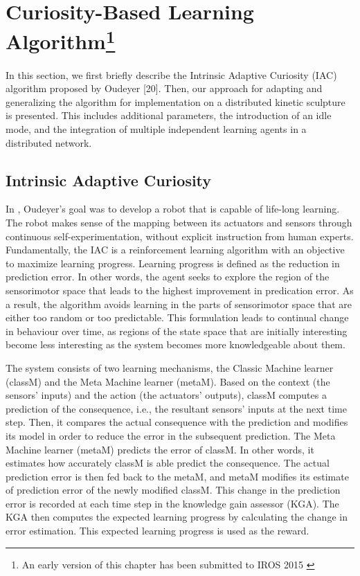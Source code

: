 \chapter[Curiosity-Based Learning Algorithm]
{Curiosity-Based Learning Algorithm\footnote{An early version of this chapter has been submitted to IROS 2015 \cite{Chan2015} }} 
\label{chap:cbla}
 
In this section, we first briefly describe the Intrinsic Adaptive Curiosity (IAC) algorithm proposed by Oudeyer [20]. Then, our approach for adapting and generalizing the algorithm for implementation on a distributed kinetic sculpture is presented. This includes additional parameters, the introduction of an idle mode, and the integration of multiple independent learning agents in a distributed network. 

\section{Intrinsic Adaptive Curiosity}

In \cite{Oudeyer2007}, Oudeyer's goal was to develop a robot that is capable of life-long learning. The robot makes sense of the mapping between its actuators and sensors through continuous self-experimentation, without explicit instruction from human experts. Fundamentally, the IAC is a reinforcement learning algorithm with an objective to maximize learning progress. Learning progress is defined as the reduction in prediction error. In other words, the agent seeks to explore the region of the sensorimotor space that leads to the highest improvement in predication error. As a result, the algorithm avoids learning in the parts of sensorimotor space that are either too random or too predictable. This formulation leads to continual change in behaviour over time, as regions of the state space that are initially interesting become less interesting as the system becomes more knowledgeable about them. 
 
The system consists of two learning mechanisms, the Classic Machine learner (classM) and the Meta Machine learner (metaM).  Based on the context (the sensors' inputs) and the action (the actuators' outputs), classM computes a prediction of the consequence, i.e., the resultant sensors' inputs at the next time step. Then, it compares the actual consequence with the prediction and modifies its model in order to reduce the error in the subsequent prediction. The Meta Machine learner (metaM) predicts the error of classM. In other words, it estimates how accurately classM is able predict the consequence. The actual prediction error is then fed back to the metaM, and metaM modifies its estimate of prediction error of the newly modified classM. This change in the prediction error is recorded at each time step in the knowledge gain assessor (KGA). The KGA then computes the expected learning progress by calculating the change in error estimation.  This expected learning progress is used as the reward. 


